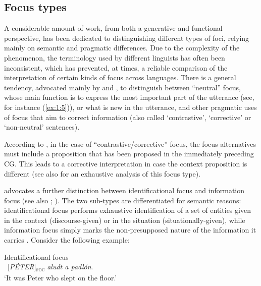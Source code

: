 \subsection{Focus types} \label{sub:2.1.2}

A considerable amount of work, from both a generative and functional perspective,  has been dedicated to distinguishing different types of foci, relying mainly on semantic and pragmatic differences. Due to the complexity of the phenomenon, the terminology used by different linguists has often been inconsistent, which has prevented, at times, a reliable comparison of the interpretation of certain kinds of focus across languages. 
There is a general tendency, advocated mainly by \textcite{bolinger1972intonation} and \textcite{schmerling1973aspects}, to distinguish between ``neutral” focus, whose main function is to express the most important part of the utterance (see, for instance (\ref{ex:1:5})), or what is new in the utterance, and other pragmatic uses of focus that aim to correct information (also called `contrastive', `corrective' or `non-neutral' sentences).

According to \textcite{krifka2008basic}, in the case of ``contrastive/corrective” focus, the focus alternatives must include a proposition that has been proposed in the immediately preceding CG. This leads to a corrective interpretation in case the context proposition is different (see also \cite{truckenbrodt1995phonological, rooth1996focus, steube2001correction, van2004incompatibility, REPP20101333} for an exhaustive analysis of this focus type).

 \textcite{kiss1998identificational} advocates a further distinction between identificational focus and information focus (see also \cite{rochemont1986focus}; \cite{campos1990focalization}). The two sub-types are  differentiated for semantic reasons: identificational focus performs exhaustive identification of a set of entities given in the context (discourse-given) or in the situation (situationally-given), while information focus simply marks the non-presupposed nature of the information it carries \parencite{riester2013focus}. Consider the following example:
 
\ea \label{ex:1:6}   {Identificational focus}\\
 \ [\textit{PÉTER}]\textsubscript{\textsc{foc}} \normalsize \textit{aludt a padlón}.\\
‘It was Peter who slept on the floor.’ \hfill \parencite[75]{kiss2008topic}   

\z

